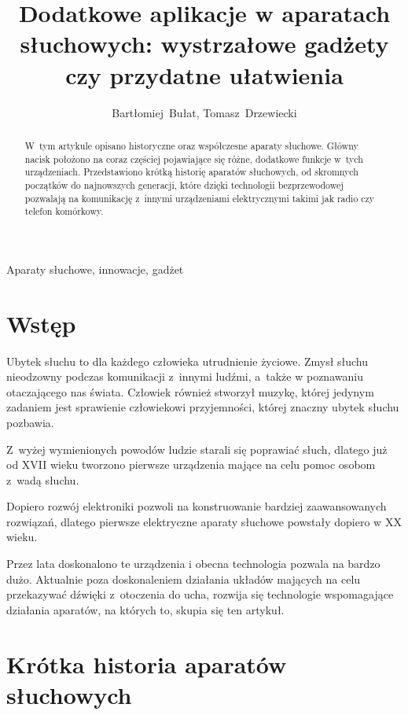 \documentclass[journal,11pt]{IEEEtran}
\title{Dodatkowe aplikacje w aparatach słuchowych: wystrzałowe gadżety czy przydatne ułatwienia}
\author{Bartłomiej~Bułat, Tomasz~Drzewiecki}
\begin{document}

\maketitle


\begin{abstract}
W~tym artykule opisano historyczne oraz współczesne aparaty słuchowe. Główny
nacisk położono na coraz częściej pojawiające się różne, dodatkowe funkcje
w~tych urządzeniach. Przedstawiono krótką historię aparatów słuchowych, od
skromnych początków do najnowszych generacji, które dzięki technologii
bezprzewodowej pozwalają na komunikację z~innymi urządzeniami elektrycznymi
takimi jak radio czy telefon komórkowy.
\end{abstract}

\begin{IEEEkeywords}
Aparaty słuchowe, innowacje, gadżet
\end{IEEEkeywords}

\section{Wstęp}

Ubytek słuchu to dla każdego człowieka utrudnienie życiowe. Zmysł słuchu
nieodzowny podczas komunikacji z~innymi ludźmi, a~także w poznawaniu
otaczającego nas świata. Człowiek również stworzył muzykę, której jedynym
zadaniem jest sprawienie człowiekowi przyjemności, której znaczny ubytek słuchu
pozbawia.

Z~wyżej wymienionych powodów ludzie starali się poprawiać słuch, dlatego już od
XVII wieku tworzono pierwsze urządzenia mające na celu pomoc osobom z~wadą słuchu.

Dopiero rozwój elektroniki pozwoli na konstruowanie bardziej zaawansowanych
rozwiązań, dlatego pierwsze elektryczne aparaty słuchowe powstały dopiero w XX
wieku.

Przez lata doskonalono te urządzenia i obecna technologia pozwala na bardzo
dużo. Aktualnie poza doskonaleniem działania układów mających na celu
przekazywać dźwięki z~otoczenia do ucha, rozwija się technologie wspomagające
działania aparatów, na których to, skupia się ten artykuł.

\section{Krótka historia aparatów słuchowych}
\end{document}
